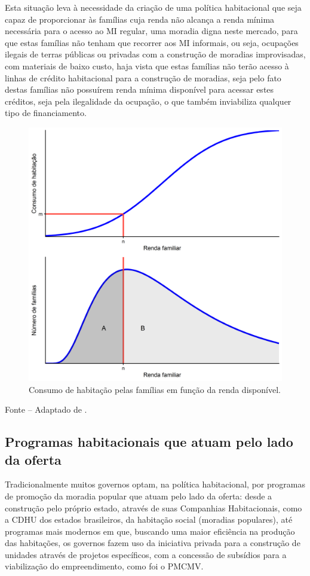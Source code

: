 \documentclass[
	12pt,				%
	oneside,			%
	a4paper,			%
	chapter=TITLE,		%
	section=TITLE,		%
	english,			%
	brazil				%
	]{abntex2}
\newcommand{\bcenter}{\begin{center}}
\newcommand{\ecenter}{\end{center}}
\begin{document}
\begin{refsection}
Esta situação leva à necessidade da criação de uma política habitacional que
seja capaz de proporcionar às famílias cuja renda não alcança a renda mínima
necessária para o acesso ao \gls{MI} regular, uma moradia digna neste mercado,
para que estas famílias não tenham que recorrer aos \gls{MI} informais, ou seja,
ocupações ilegais de terras públicas ou privadas com a construção de moradias
improvisadas, com materiais de baixo custo, haja vista que estas famílias não
terão acesso à linhas de crédito habitacional para a construção de moradias,
seja pelo fato destas famílias não possuírem renda mínima disponível para
acessar estes créditos, seja pela ilegalidade da ocupação, o que também
inviabiliza qualquer tipo de financiamento.
\begin{figure}[H]

{\centering \includegraphics[width=0.7\linewidth]{images/consumo-1} 

}

\caption{Consumo de habitação pelas famílias em função da renda disponível.}\label{fig:consumo}
\end{figure}
\bcenter

\small Fonte -- Adaptado de \textcite[p.~257]{bertaud}.
\ecenter

\hypertarget{programas-habitacionais-que-atuam-pelo-lado-da-oferta}{%
\subsection{Programas habitacionais que atuam pelo lado da oferta}\label{programas-habitacionais-que-atuam-pelo-lado-da-oferta}}

Tradicionalmente muitos governos optam, na política habitacional, por programas
de promoção da moradia popular que atuam pelo lado da oferta: desde a construção
pelo próprio estado, através de suas Companhias Habitacionais, como a \gls{CDHU}
dos estados brasileiros, da habitação social (moradias populares), até programas
mais modernos em que, buscando uma maior eficiência na produção das habitações,
os governos fazem uso da iniciativa privada para a construção de unidades através
de projetos específicos, com a concessão de subsídios para a viabilização do
empreendimento, como foi o \gls{PMCMV}.


\end{refsection}
\end{document}
